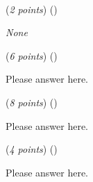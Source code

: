 \documentclass{template}
\begin{document}
\newpage

\begin{problem}
~\newline
~\newline


\begin{subproblem}
(\textit{2 points}) (\scorecodeemoji{})


\end{subproblem}

\begin{solution}
\textit{None}
\end{solution}

\begin{subproblem}
(\textit{6 points}) (\scoretextemoji{}\scorecodeemoji{})


\end{subproblem}

\begin{solution}
Please answer here.
\end{solution}

\begin{subproblem}
(\textit{8 points}) (\scoretextemoji{}\scoreplotemoji{}\scorecodeemoji{})


\end{subproblem}

\begin{solution}
Please answer here.
\end{solution}

\begin{subproblem}
(\textit{4 points}) (\scoretextemoji{}\scorecodeemoji{})


\end{subproblem}

\begin{solution}
Please answer here.
\end{solution}
\end{problem}

\newpage
\end{document}
